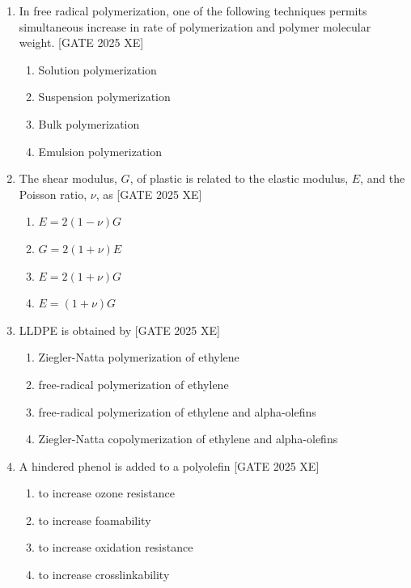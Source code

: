 \documentclass[journal,12pt,onecolumn]{IEEEtran}
\theoremstyle{remark}
\begin{document}
\begin{enumerate}
\hfill[GATE 2013 XE]
  
\item In free radical polymerization, one of the following techniques permits simultaneous increase in rate of polymerization and polymer molecular weight. \hfill[GATE 2025 XE]

\begin{multicols}{2}
\begin{enumerate}
\item Solution polymerization
\item Suspension polymerization
\item Bulk polymerization
\item Emulsion polymerization
\end{enumerate}
\end{multicols}

\item The shear modulus, $G$, of plastic is related to the elastic modulus, $E$, and the Poisson ratio, $\nu$, as \hfill[GATE 2025 XE]

\begin{multicols}{2}
\begin{enumerate}
\item $E = 2(1-\nu)G$
\item $G = 2(1+\nu)E$
\item $E = 2(1+\nu)G$
\item $E = (1+\nu)G$
\end{enumerate}
\end{multicols}

\item LLDPE is obtained by \hfill[GATE 2025 XE]

\begin{multicols}{2}
\begin{enumerate}
\item Ziegler-Natta polymerization of ethylene
\item free-radical polymerization of ethylene
\item free-radical polymerization of ethylene and alpha-olefins
\item Ziegler-Natta copolymerization of ethylene and alpha-olefins
\end{enumerate}
\end{multicols}

\item A hindered phenol is added to a polyolefin \hfill[GATE 2025 XE]

\begin{multicols}{2}
\begin{enumerate}
\item to increase ozone resistance
\item to increase foamability
\item to increase oxidation resistance
\item to increase crosslinkability
\end{enumerate}
\end{multicols}


\end{enumerate}
\end{document}
